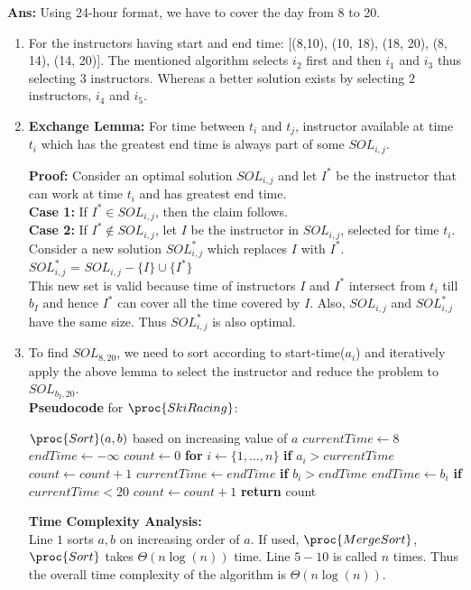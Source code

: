 \documentclass[11pt]{article}
\begin{document}
\noindent\textbf{Ans: } Using 24-hour format, we have to cover the day from 8 to 20.
\begin{enumerate}
    \item For the instructors having start and end time: [(8,10), (10, 18), (18, 20), (8, 14), (14, 20)]. The mentioned algorithm selects $i_2$ first and then $i_1$ and $i_3$ thus selecting 3 instructors. Whereas a better solution exists by selecting $2$ instructors, $i_4$ and $i_5$.
    \item \textbf{Exchange Lemma: } For time between $t_i$ and $t_j$, instructor available at time $t_i$ which has the greatest end time is always part of some $SOL_{i,j}$.
    
    \textbf{Proof:} Consider an optimal solution $SOL_{i,j}$ and let $I^*$ be the instructor that can work at time $t_i$ and has greatest end time.\\
    \textbf{Case 1:} If $I^* \in SOL_{i,j}$, then the claim follows.\\
    \textbf{Case 2:} If $I^* \notin SOL_{i,j}$, let $I$ be the instructor in $SOL_{i,j}$, selected for time $t_i$.\\
    Consider a new solution $SOL^*_{i,j}$ which replaces $I$ with $I^*$.\\
    $SOL^*_{i,j}$ = $SOL_{i,j}-\{I\} \cup \{I^*\}$\\
    This new set is valid because time of instructors $I$ and $I^*$ intersect from $t_i$ till $b_I$ and hence $I^*$ can cover all the time covered by $I$. Also, $SOL_{i,j}$ and $SOL^*_{i,j}$ have the same size. Thus $SOL^*_{i,j}$ is also optimal.
    
    \item To find $SOL_{8,20}$, we need to sort according to start-time($a_i$) and iteratively apply the above lemma to select the instructor and reduce the problem to $SOL_{b_I, 20}$.\\
    \newpage
    \textbf{Pseudocode} for $\proc{SkiRacing}$:
        \begin{codebox}
        \li $\proc{Sort}(a,b)$ based on increasing value of $a$
        \li $currentTime \leftarrow 8$
        \li $endTime \leftarrow -\infty$
        \li $count \leftarrow 0$
        \li \textbf{for} $i \leftarrow \{1, ..., n\}$
        \li \quad \textbf{if} $a_i > currentTime$
        \li \quad \quad $count \leftarrow count+1$
        \li \quad \quad $currentTime \leftarrow endTime$
        \li \quad \textbf{if} $b_i > endTime$
        \li \quad \quad $endTime \leftarrow b_i$
        \li \textbf{if} $currentTime<20$
        \li \quad $count \leftarrow count+1$
        \li \textbf{return} count
        \end{codebox}
    
    \textbf{Time Complexity Analysis:}\\
    Line $1$ sorts $a,b$ on increasing order of $a$. If used, $\proc{MergeSort}$, $\proc{Sort}$ takes $\Theta(n\log(n))$ time. Line $5-10$ is called $n$ times.
    Thus the overall time complexity of the algorithm is $\Theta(n\log(n))$.
    
\end{enumerate}
\end{document}
